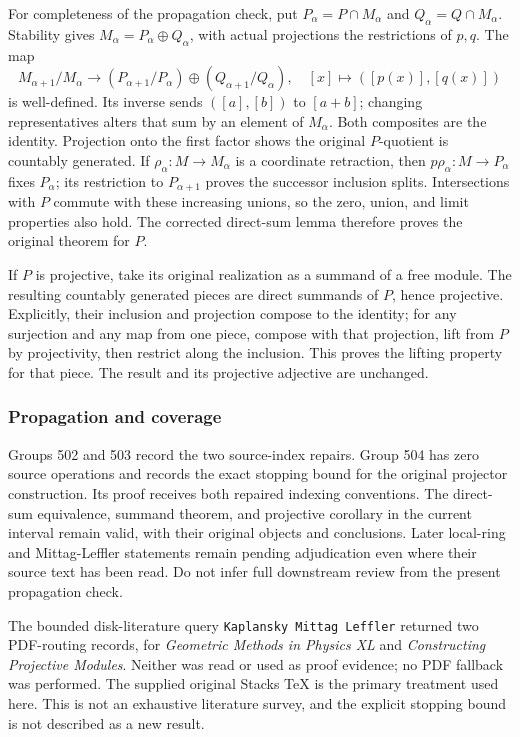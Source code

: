 For completeness of the propagation check, put \(P_\alpha=P\cap M_\alpha\) and \(Q_\alpha=Q\cap M_\alpha\). Stability gives \(M_\alpha=P_\alpha\oplus Q_\alpha\), with actual projections the restrictions of \(p,q\). The map \[
M_{\alpha+1}/M_\alpha\longrightarrow
(P_{\alpha+1}/P_\alpha)\oplus(Q_{\alpha+1}/Q_\alpha),
\quad [x]\longmapsto([p(x)],[q(x)])
\] is well-defined. Its inverse sends \(([a],[b])\) to \([a+b]\); changing representatives alters that sum by an element of \(M_\alpha\). Both composites are the identity. Projection onto the first factor shows the original \(P\)-quotient is countably generated. If \(\rho_\alpha:M\to M_\alpha\) is a coordinate retraction, then \(p\rho_\alpha:M\to P_\alpha\) fixes \(P_\alpha\); its restriction to \(P_{\alpha+1}\) proves the successor inclusion splits. Intersections with \(P\) commute with these increasing unions, so the zero, union, and limit properties also hold. The corrected direct-sum lemma therefore proves the original theorem for \(P\).

If \(P\) is projective, take its original realization as a summand of a free module. The resulting countably generated pieces are direct summands of \(P\), hence projective. Explicitly, their inclusion and projection compose to the identity; for any surjection and any map from one piece, compose with that projection, lift from \(P\) by projectivity, then restrict along the inclusion. This proves the lifting property for that piece. The result and its projective adjective are unchanged.

\subsubsection{Propagation and coverage}\label{algebra-proof-011-propagation-and-coverage}

Groups 502 and 503 record the two source-index repairs. Group 504 has zero source operations and records the exact stopping bound for the original projector construction. Its proof receives both repaired indexing conventions. The direct-sum equivalence, summand theorem, and projective corollary in the current interval remain valid, with their original objects and conclusions. Later local-ring and Mittag-Leffler statements remain pending adjudication even where their source text has been read. Do not infer full downstream review from the present propagation check.

The bounded disk-literature query \texttt{Kaplansky\ Mittag\ Leffler} returned two PDF-routing records, for \emph{Geometric Methods in Physics XL} and \emph{Constructing Projective Modules}. Neither was read or used as proof evidence; no PDF fallback was performed. The supplied original Stacks TeX is the primary treatment used here. This is not an exhaustive literature survey, and the explicit stopping bound is not described as a new result.
